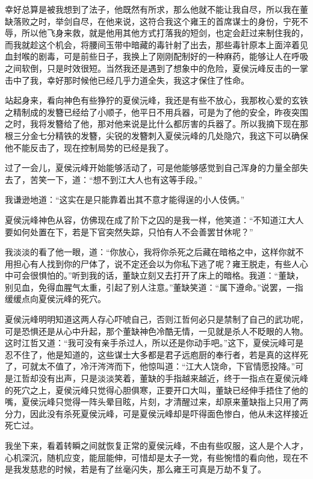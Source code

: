 幸好总算是被我想到了法子，他既然有所求，那么他就不能让我自尽，所以我在董缺落败之时，举剑自尽，在他来说，这符合我这个雍王的首席谋士的身份，宁死不辱，所以他飞身来救，就是他用其他方式打落我的短剑，也定会赶过来制住我的，而我就趁这个机会，将腰间玉带中暗藏的毒针射了出去，那些毒针原本上面淬着见血封喉的剧毒，可是前些日子，我换上了刚刚配制好的一种麻药，能够让人在呼吸之间软倒，只是时效很短。当然我还是遇到了想象中的危险，夏侯沅峰反击的一掌击中了我，幸好那时候他已经几乎力道全失，我这才保住了性命。

站起身来，看向神色有些狰狞的夏侯沅峰，我还是有些不放心，我那枚心爱的玄铁之精制成的发簪已经给了小顺子，他平日不用兵器，可是为了他的安全，昨夜突围之时，我将发簪给了他，那对他来说是比什么都厉害的兵器了。所以我摘下现在那根三分金七分精铁的发簪，尖锐的发簪刺入夏侯沅峰的几处隐穴，我这下可以确保他不能反击了，现在控制局势的已经是我了。

过了一会儿，夏侯沅峰开始能够活动了，可是他能够感觉到自己浑身的力量全部失去了，苦笑一下，道：“想不到江大人也有这等手段。”

我谦逊地道：“这实在是只能靠着出其不意才能得逞的小人伎俩。”

夏侯沅峰神色从容，仿佛现在成了阶下之囚的是我一样，他笑道：“不知道江大人要如何处置在下，若是下官突然失踪，只怕有人不会善罢甘休呢？”

我淡淡的看了他一眼，道：“你放心，我将你杀死之后藏在暗格之中，这样你就不用担心有人找到你的尸体了，说不定还会以为你私下逃了呢？雍王脱走，有些人心中可会很惧怕的。”听到我的话，董缺立刻又去打开了床上的暗格。我道：“董缺，别见血，免得血腥气太重，引起了别人注意。”董缺笑道：“属下遵命。”说罢，一指缓缓点向夏侯沅峰的死穴。

夏侯沅峰明明知道这两人存心吓唬自己，否则江哲何必只是禁制了自己的武功呢，可是恐惧还是从心中升起，那个董缺神色冷酷无情，一见就是杀人不眨眼的人物。这时江哲又道：“我可没有亲手杀过人，所以还是你动手吧。”这下，夏侯沅峰可是忍不住了，他是知道的，这些谋士大多都是君子远庖厨的奉行者，若是真的这样死了，可就太不值了，冷汗涔涔而下，他惊叫道：“江大人饶命，下官情愿投降。”可是江哲却没有出声，只是淡淡笑着，董缺的手指越来越近，终于一指点在夏侯沅峰的死穴之上，夏侯沅峰只觉得心胆俱寒，正要开口大叫，董缺已经伸手捂住了他的嘴，夏侯沅峰只觉得一阵头晕目眩，片刻，才清醒过来，却原来董缺指上只用了两分力，因此没有杀死夏侯沅峰，可是夏侯沅峰却是吓得面色惨白，他从未这样接近死亡过。

我坐下来，看着转瞬之间就恢复正常的夏侯沅峰，不由有些叹服，这人是个人才，心机深沉，随机应变，能屈能伸，可惜却是太子一党，有些惋惜的看向他，现在不是我发慈悲的时候，若是有了丝毫闪失，那么雍王可真是万劫不复了。

